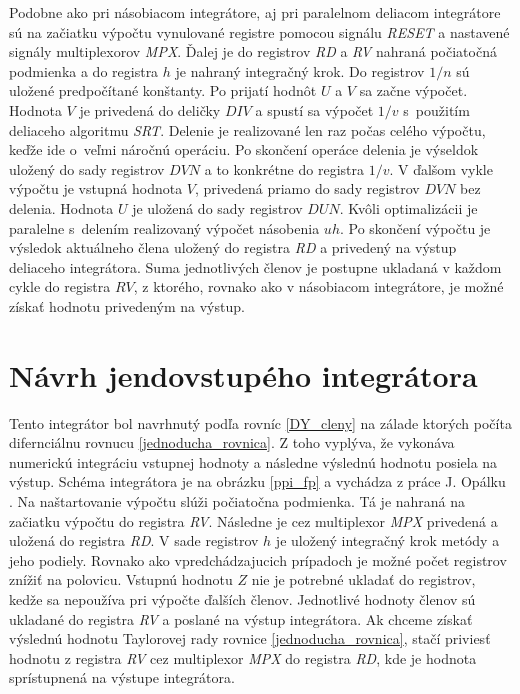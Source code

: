Podobne ako pri násobiacom integrátore, aj pri paralelnom deliacom integrátore sú na začiatku výpočtu vynulované registre pomocou signálu \textit{RESET} a nastavené signály multiplexorov \textit{MPX}. Ďalej je do registrov \textit{RD} a \textit{RV} nahraná počiatočná podmienka a do registra $ h $ je nahraný integračný krok. Do registrov $ 1/n $ sú uložené predpočítané konštanty. Po prijatí hodnôt $ U $ a $ V $ sa začne výpočet. Hodnota $ V $ je privedená do deličky $ DIV $ a spustí sa výpočet $ 1/v $ s~použitím deliaceho algoritmu \textit{SRT}. Delenie je realizované len raz počas celého výpočtu, keďže ide o~veľmi náročnú operáciu. Po skončení operáce delenia je výseldok uložený do sady registrov $ DVN $ a to konkrétne do registra $ 1/v $. V ďalšom vykle výpočtu je vstupná hodnota $ V $, privedená priamo do sady registrov $ DVN $ bez delenia. Hodnota $ U $ je uložená do sady registrov $ DUN $. Kvôli optimalizácii je paralelne s~delením realizovaný výpočet násobenia $ uh $. Po skončení výpočtu je výsledok aktuálneho člena uložený do registra \textit{RD} a privedený na výstup deliaceho integrátora. Suma jednotlivých členov je postupne ukladaná v každom cykle do registra $ RV $, z ktorého, rovnako ako v násobiacom integrátore, je možné získať hodnotu privedeným na výstup.


\section{Návrh jendovstupého integrátora}
Tento integrátor bol navrhnutý podľa rovníc \eqref{DY_cleny} na zálade ktorých počíta difernciálnu rovnucu \eqref{jednoducha_rovnica}. Z toho vyplýva, že vykonáva numerickú integráciu vstupnej hodnoty a následne výslednú hodnotu posiela na výstup. Schéma integrátora je na obrázku \ref{ppi_fp} a vychádza z práce J. Opálku \cite{OpalkaBP}. Na naštartovanie výpočtu slúži počiatočna podmienka. Tá je nahraná na začiatku výpočtu do registra \textit{RV}. Následne je cez multiplexor \textit{MPX} privedená a uložená do registra \textit{RD}. V sade registrov $ h $ je uložený integračný krok metódy a jeho podiely. Rovnako ako vpredchádzajucich prípadoch je možné počet registrov znížiť na polovicu. Vstupnú hodnotu $ Z $ nie je potrebné ukladať do registrov, kedže sa nepoužíva pri výpočte ďalších členov. Jednotlivé hodnoty členov sú ukladané do registra \textit{RV} a poslané na výstup integrátora. Ak chceme získať výslednú hodnotu Taylorovej rady rovnice \eqref{jednoducha_rovnica}, stačí priviesť hodnotu z registra \textit{RV} cez multiplexor \textit{MPX} do registra \textit{RD}, kde je hodnota sprístupnená na výstupe integrátora.


